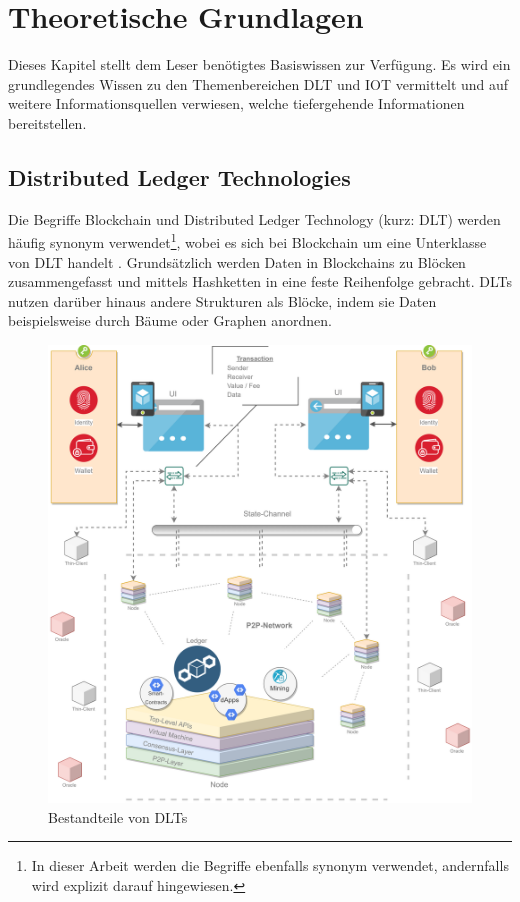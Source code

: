 \chapter{Theoretische Grundlagen}
\label{ch:fundamentals}
Dieses Kapitel stellt dem Leser benötigtes Basiswissen zur Verfügung. Es wird ein grundlegendes Wissen zu den Themenbereichen \ac{DLT} und \ac{IOT} vermittelt und auf weitere Informationsquellen verwiesen, welche tiefergehende Informationen bereitstellen.

%
%
\section{Distributed Ledger Technologies}
\label{sec:fundamentals:dlt}
Die Begriffe Blockchain und Distributed Ledger Technology (kurz: \ac{DLT}) werden häufig synonym verwendet\footnote{In dieser Arbeit werden die Begriffe ebenfalls synonym verwendet, andernfalls wird explizit darauf hingewiesen.}, wobei es sich bei Blockchain um eine Unterklasse von \ac{DLT} handelt \cite{mastering2017}. Grundsätzlich werden Daten in Blockchains zu Blöcken zusammengefasst und mittels Hashketten in eine feste Reihenfolge gebracht. \ac{DLT}s nutzen darüber hinaus andere Strukturen als Blöcke, indem sie Daten beispielsweise durch Bäume oder Graphen anordnen.\\

\begin{figure}[h]
 \centering
 \includegraphics[width=1.0\textwidth]{gfx/Overview-DLT.png}
 \caption{Bestandteile von DLTs}
 \label{fig:chapter02:overview-dlt}
\end{figure}

